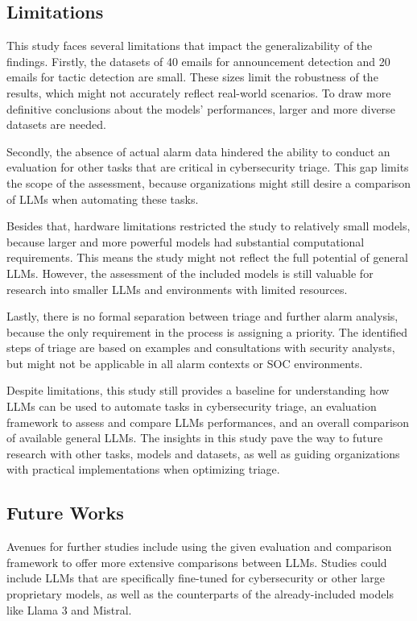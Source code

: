 \subsection{Limitations}
\label{subsec:limitations}

This study faces several limitations that impact the generalizability of the findings.
Firstly, the datasets of 40 emails for announcement detection and 20 emails for tactic detection are small.
These sizes limit the robustness of the results, which might not accurately reflect real-world scenarios.
To draw more definitive conclusions about the models' performances, larger and more diverse datasets are needed.

Secondly, the absence of actual alarm data hindered the ability to conduct an evaluation for other tasks that are
critical in cybersecurity triage.
This gap limits the scope of the assessment, because organizations might still desire a comparison of LLMs when
automating these tasks.

Besides that, hardware limitations restricted the study to relatively small models, because larger and more powerful
models had substantial computational requirements.
This means the study might not reflect the full potential of general LLMs.
However, the assessment of the included models is still valuable for research into smaller LLMs and environments with
limited resources.

Lastly, there is no formal separation between triage and further alarm analysis, because the only requirement in the
process is assigning a priority.
The identified steps of triage are based on examples and consultations with security analysts, but might not be
applicable in all alarm contexts or SOC environments.

Despite limitations, this study still provides a baseline for understanding how LLMs can be used to automate tasks in
cybersecurity triage, an evaluation framework to assess and compare LLMs performances, and an overall comparison of
available general LLMs.
The insights in this study pave the way to future research with other tasks, models and datasets, as well as guiding
organizations with practical implementations when optimizing triage.

\subsection{Future Works}
\label{subsec:future-works}

Avenues for further studies include using the given evaluation and comparison framework to offer more extensive
comparisons between LLMs.
Studies could include LLMs that are specifically fine-tuned for cybersecurity or other large proprietary models, as
well as the counterparts of the already-included models like Llama 3 and Mistral.

